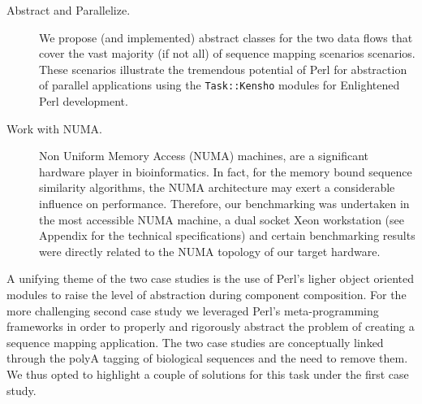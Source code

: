 \documentclass[10pt]{article}
\begin{document}
\begin{description}
\item [Abstract and  Parallelize.] We propose (and implemented) abstract classes for the two data flows that cover the vast majority (if not all) of sequence mapping scenarios scenarios. These scenarios illustrate the tremendous potential of Perl for abstraction of parallel applications using the \texttt{Task::Kensho} modules for Enlightened Perl development.
\item [Work with NUMA.] Non Uniform Memory Access (NUMA) machines, are a significant hardware player in bioinformatics. In fact, for the memory bound sequence similarity algorithms, the NUMA architecture may exert a considerable influence on performance\cite{lopez-villellas_genarchbench_2024}.  Therefore, our benchmarking was undertaken in the most accessible NUMA machine, a dual socket Xeon workstation (see Appendix for the technical specifications) and certain benchmarking results were directly related to the NUMA topology of our target hardware.
\end{description}
A unifying theme of the two case studies is the  use of Perl's ligher object oriented modules to raise the level of abstraction during component composition. For the more challenging second case study we leveraged Perl's meta-programming frameworks in order to properly and rigorously abstract the problem of creating a sequence mapping application. The two case studies are conceptually linked through the polyA tagging of biological sequences and the need to remove them. We thus opted to highlight a couple of solutions for this task under the first case study. 
\end{document}

